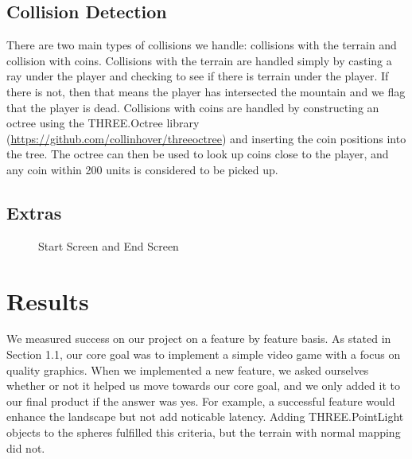 \documentclass{article}
\begin{document}
\subsection{Collision Detection}
There are two main types of collisions we handle: collisions with the terrain and collision with coins. Collisions with the terrain are handled simply by casting a ray under the player and checking to see if there is terrain under the player. If there is not, then that means the player has intersected the mountain and we flag that the player is dead. Collisions with coins are handled by constructing an octree using the THREE.Octree library (\url{https://github.com/collinhover/threeoctree}) and inserting the coin positions into the tree. The octree can then be used to look up coins close to the player, and any coin within 200 units is considered to be picked up.

\subsection{Extras}

\begin{figure}[H]
\begin{center}
\caption{Start Screen and End Screen}
\end{center}
\end{figure}

\section{Results}
We measured success on our project on a feature by feature basis.  As stated in Section 1.1, our core goal was to implement a simple video game with a focus on quality graphics.  When we implemented a new feature, we asked ourselves whether or not it helped us move towards our core goal, and we only added it to our final product if the answer was yes.  For example, a successful feature would enhance the landscape but not add noticable latency. Adding THREE.PointLight objects to the spheres fulfilled this criteria, but the terrain with normal mapping did not.\\
\end{document}

